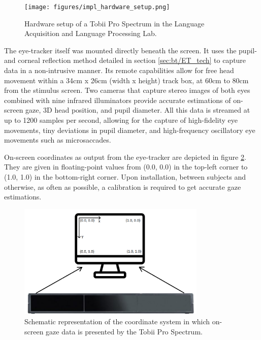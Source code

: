\begin{figure}[h]
    \centering
    \texttt{[image: figures/impl\_hardware\_setup.png]}
    \caption{Hardware setup of a Tobii Pro Spectrum in the Language Acquisition and Language Processing Lab.}
    \label{fig:impl_hardware_setup}
\end{figure}

The eye-tracker itself was mounted directly beneath the screen. It uses the pupil- and corneal reflection method detailed in section \ref{sec:bt/ET_tech} to capture data in a non-intrusive manner. Its remote capabilities allow for free head movement within a 34cm x 26cm (width x height) track box, at 60cm to 80cm from the stimulus screen. Two cameras that capture stereo images of both eyes combined with nine infrared illuminators provide accurate estimations of on-screen gaze, 3D head position, and pupil diameter. All this data is streamed at up to 1200 samples per second, allowing for the capture of high-fidelity eye movements, tiny deviations in pupil diameter, and high-frequency oscillatory eye movements such as microsaccades. 

On-screen coordinates as output from the eye-tracker are depicted in figure \ref{fig:impl_output}. They are given in floating-point values from (0.0, 0.0) in the top-left corner to (1.0, 1.0) in the bottom-right corner. Upon installation, between subjects and otherwise, as often as possible, a calibration is required to get accurate gaze estimations.

\begin{figure}[h]
    \centering
    \includegraphics[width=0.8\textwidth]{figures/impl_output.png}
    \caption{Schematic representation of the coordinate system in which on-screen gaze data is presented by the Tobii Pro Spectrum.}
    \label{fig:impl_output}
\end{figure}